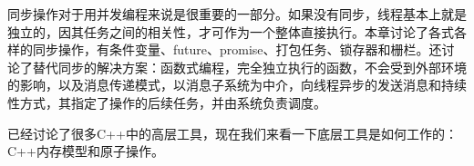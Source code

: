 
同步操作对于用并发编程来说是很重要的一部分。如果没有同步，线程基本上就是独立的，因其任务之间的相关性，才可作为一个整体直接执行。本章讨论了各式各样的同步操作，有条件变量、future、promise、打包任务、锁存器和栅栏。还讨论了替代同步的解决方案：函数式编程，完全独立执行的函数，不会受到外部环境的影响，以及消息传递模式，以消息子系统为中介，向线程异步的发送消息和持续性方式，其指定了操作的后续任务，并由系统负责调度。

已经讨论了很多C++中的高层工具，现在我们来看一下底层工具是如何工作的：C++内存模型和原子操作。

